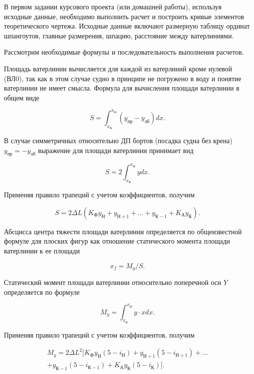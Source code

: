 В первом задании курсового проекта (или домашней работы), используя исходные данные, необходимо выполнить расчет и построить кривые элементов теоретического чертежа.
Исходные данные включают размерную таблицу ординат шпангоутов, главные размерения, шпацию, расстояние между ватерлиниями.

Рассмотрим необходимые формулы и последовательность выполнения расчетов.

Площадь ватерлинии вычисляется для каждой из ватерлиний кроме нулевой (ВЛ0), так как в этом случае судно в принципе не погружено в воду и понятие ватерлинии не имеет смысла.
Формула для вычисления площади ватерлинии в общем виде

\begin{equation}
    S = \int_{x_{\text{К}}}^{x_{\text{Н}}} (y_{\text{пр}} - y_{\text{лб}}) dx.
\end{equation}

В случае симметричных относительно ДП бортов (посадка судна без крена) $y_{\text{пр}} = - y_{\text{лб}}$ выражение для площади ватерлинии принимает вид

\begin{equation}
    S = 2 \int_{x_{\text{К}}}^{x_{\text{Н}}} y dx.
\end{equation}

Применяя правило трапеций с учетом коэффициентов, получим

\begin{equation}
    S = 2 \Delta L (K_{\text{Ф}} y_{\text{Н}} + y_{\text{Н}+1} + \dots + y_{\text{К}-1} + K_{\text{А}} y_{\text{К}}).
\end{equation}

Абсцисса центра тяжести площади ватерлинии определяется по общеизвестной формуле для плоских фигур как отношение статического момента площади ватерлинии к ее площади

\begin{equation}
    x_f = M_y / S.
\end{equation}

Статический момент площади ватерлинии относительно поперечной оси $Y$ определяется по формуле

\begin{equation}
    M_y = \int_{x_{\text{К}}}^{x_{\text{Н}}} y \cdot x dx.
\end{equation}

Применяя правило трапеций с учетом коэффициентов, получим

\begin{equation}
    \begin{split}
    M_y = 2 \Delta L^2 [K_{\text{Ф}} y_{\text{Н}} (5 - i_{\text{Н}}) + y_{\text{Н}+1}(5 - i_{\text{Н}+1})+ \dots \\
    + y_{\text{К}-1}(5-i_{\text{К}-1}) + K_{\text{А}} y_{\text{К}} (5 - i_{\text{К}})].
    \end{split}
\end{equation}

